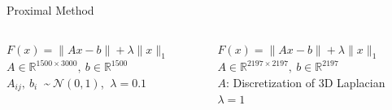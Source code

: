 \documentclass[10pt]{beamer}
\begin{document}
   \begin{frame}{Proximal Method}
   	\begin{columns}[T]
   		\begin{column}{.5\textwidth}
   			$F(x) = \lVert Ax - b \rVert + \lambda \lVert x \rVert_1$\\
   			$A \in \mathbb{R}^{1500 \times 3000},\:b \in \mathbb{R}^{1500}$\\
   			$A_{ij},\:b_i\:$ \textasciitilde $\:\mathcal{N}(0,1)$, $\:\lambda = 0.1$\\
   			\vspace{15pt}
   			\resizebox{\linewidth}{!}{}
   			\begin{center}
   				\hspace{-3pt}
   			\end{center}
   		
   		\end{column}\hfill
   		\begin{column}{.5\textwidth}
   			$F(x) = \lVert Ax - b \rVert + \lambda \lVert x \rVert_1$\\
   			$A \in \mathbb{R}^{2197 \times 2197},\:b \in \mathbb{R}^{2197}$\\
   			$A$: \small Discretization of 3D Laplacian\\
   			\normalsize$\lambda = 1$\\
   			\vspace{8pt}
   			\resizebox{\linewidth}{!}{}
   			\begin{center}
   				\hspace{5pt}
   			\end{center}
   		\end{column}
   	\end{columns}
   \end{frame}
   
\end{document}
